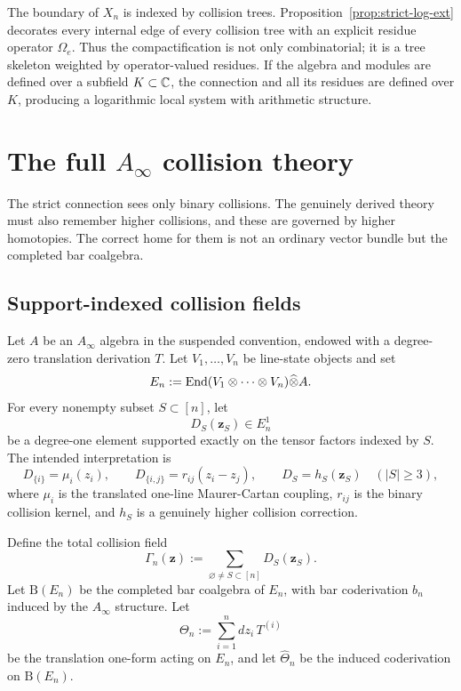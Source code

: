 \begin{remark}
The boundary of $X_n$ is indexed by collision trees. Proposition~\ref{prop:strict-log-ext} decorates every internal edge of every collision tree with an explicit residue operator $\Omega_e$. Thus the compactification is not only combinatorial; it is a tree skeleton weighted by operator-valued residues. If the algebra and modules are defined over a subfield $K\subset\mathbb C$, the connection and all its residues are defined over $K$, producing a logarithmic local system with arithmetic structure.
\end{remark}

\section{The full $A_\infty$ collision theory}\label{sec:ainfty}

The strict connection sees only binary collisions. The genuinely derived theory must also remember higher collisions, and these are governed by higher homotopies. The correct home for them is not an ordinary vector bundle but the completed bar coalgebra.

\subsection{Support-indexed collision fields}
Let $A$ be an $A_\infty$ algebra in the suspended convention, endowed with a degree-zero translation derivation $T$. Let $V_1,\dots,V_n$ be line-state objects and set
\[
 E_n:=\mathrm{End}(V_1\otimes\cdots\otimes V_n)\widehat\otimes A.
\]
For every nonempty subset $S\subset[n]$, let
\[
 D_S(\mathbf z_S)\in E_n^1
\]
be a degree-one element supported exactly on the tensor factors indexed by $S$. The intended interpretation is
\[
 D_{\{i\}}=\mu_i(z_i),
 \qquad
 D_{\{i,j\}}=r_{ij}(z_i-z_j),
 \qquad
 D_S=h_S(\mathbf z_S)\quad (|S|\ge 3),
\]
where $\mu_i$ is the translated one-line Maurer-Cartan coupling, $r_{ij}$ is the binary collision kernel, and $h_S$ is a genuinely higher collision correction.

Define the total collision field
\[
 \Gamma_n(\mathbf z):=\sum_{\varnothing\neq S\subset[n]}D_S(\mathbf z_S).
\]
Let $\mathrm B(E_n)$ be the completed bar coalgebra of $E_n$, with bar coderivation $b_n$ induced by the $A_\infty$ structure. Let
\[
 \Theta_n:=\sum_{i=1}^n dz_i\,T^{(i)}
\]
be the translation one-form acting on $E_n$, and let $\widehat\Theta_n$ be the induced coderivation on $\mathrm B(E_n)$.

